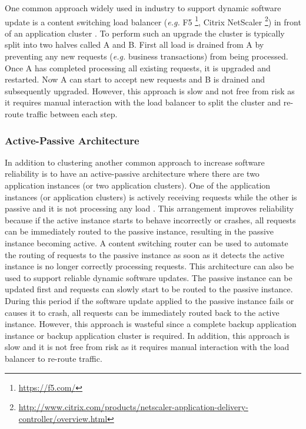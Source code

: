 \documentclass[a4paper,11pt,twoside]{article}
\begin{document}
One common approach widely used in industry to support dynamic software update is a content switching load balancer (\textit{e.g.} F5 \footnote{\url{https://f5.com/}}, Citrix  NetScaler \footnote{\url{http://www.citrix.com/products/netscaler-application-delivery-controller/overview.html}}) in front of an application cluster \cite{balancer}. To perform such an upgrade the cluster is typically split into two halves called A and B. First all load is drained from A by preventing any new requests (\textit{e.g.} business transactions) from being processed. Once A has completed processing all existing requests, it is upgraded and restarted. Now A can start to accept new requests and B is drained and subsequently upgraded. However, this approach is slow and not free from risk as it requires manual interaction with the load balancer to split the cluster and re-route traffic between each step.

\subsubsection{Active-Passive Architecture}
In addition to clustering another common approach to increase software reliability is to have an active-passive architecture where there are two application instances  (or two application clusters). One of the application instances (or application clusters) is actively receiving requests while the other is passive and it is not processing any load \cite{active_passive}. This arrangement improves reliability because if the active instance starts to behave incorrectly or crashes, all requests can be immediately routed to the passive instance, resulting in the passive instance becoming active. A content switching router can be used to automate the routing of requests to the passive instance as soon as it detects the active instance is no longer correctly processing requests. This architecture can also be used to support reliable dynamic software updates. The passive instance can be updated first and requests can slowly start to be routed to the passive instance. During this period if the software update applied to the passive instance fails or causes it to crash, all requests can be immediately routed back to the active instance. However, this approach is wasteful since a complete backup application instance or backup application cluster is required. In addition, this approach is slow and it is not free from risk as it requires manual interaction with the load balancer to re-route traffic.
\end{document}
